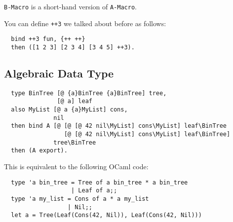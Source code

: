 \documentclass{book}
\begin{document}
\texttt{B-Macro} is a short-hand version of \texttt{A-Macro}.

You can define \texttt{++3} we talked about before as follows:
\begin{verbatim}
  bind ++3 fun, {++ ++}
  then ([1 2 3] [2 3 4] [3 4 5] ++3).
\end{verbatim}

\subsection{Algebraic Data Type}
\label{ssec:adt-example}
\begin{verbatim}
  type BinTree [@ {a}BinTree {a}BinTree] tree,
               [@ a] leaf
  also MyList [@ a {a}MyList] cons,
              nil
  then bind A [@ [@ [@ 42 nil\MyList] cons\MyList] leaf\BinTree
                 [@ [@ 42 nil\MyList] cons\MyList] leaf\BinTree]
              tree\BinTree
  then (A export).
\end{verbatim}

This is equivalent to the following OCaml code:
\begin{verbatim}
  type 'a bin_tree = Tree of a bin_tree * a bin_tree
                   | Leaf of a;;
  type 'a my_list = Cons of a * a my_list
                  | Nil;;
  let a = Tree(Leaf(Cons(42, Nil)), Leaf(Cons(42, Nil)))
\end{verbatim}
\end{document}
